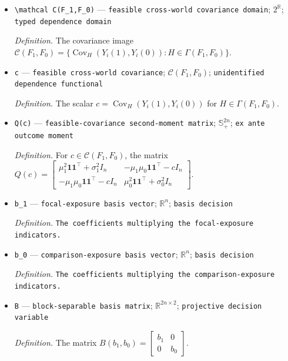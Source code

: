 \documentclass{article}
\begin{document}
\begin{itemize}
  \item \texttt{\textbackslash{}\allowbreak{}mathcal C(F\_\allowbreak{}1,\allowbreak{}F\_\allowbreak{}0)} --- \texttt{feasible cross-\allowbreak{}world covariance domain}; \(2^{\mathbb R}\); \texttt{typed dependence domain}
  \par\smallskip\noindent\emph{Definition.} The covariance image \(\mathcal C(F_1,F_0)=\{\operatorname{Cov}_H(Y_i(1),Y_i(0)):H\in\Gamma(F_1,F_0)\}\).
  \item \texttt{c} --- \texttt{feasible cross-\allowbreak{}world covariance}; \(\mathcal C(F_1,F_0)\); \texttt{unidentified dependence functional}
  \par\smallskip\noindent\emph{Definition.} The scalar \(c=\operatorname{Cov}_H(Y_i(1),Y_i(0))\) for \(H\in\Gamma(F_1,F_0)\).
  \item \texttt{Q(c)} --- \texttt{feasible-\allowbreak{}covariance second-\allowbreak{}moment matrix}; \(\mathbb S_+^{2n}\); \texttt{ex ante outcome moment}
  \par\smallskip\noindent\emph{Definition.} For \(c\in\mathcal C(F_1,F_0)\), the matrix \(Q(c)=\begin{bmatrix}\mu_1^2\mathbf 1\mathbf 1^{\top}+\sigma_1^2I_n&-\mu_1\mu_0\mathbf 1\mathbf 1^{\top}-cI_n\\-\mu_1\mu_0\mathbf 1\mathbf 1^{\top}-cI_n&\mu_0^2\mathbf 1\mathbf 1^{\top}+\sigma_0^2I_n\end{bmatrix}\).
  \item \texttt{b\_\allowbreak{}1} --- \texttt{focal-\allowbreak{}exposure basis vector}; \(\mathbb R^n\); \texttt{basis decision}
  \par\smallskip\noindent\emph{Definition.} \texttt{The coefficients multiplying the focal-\allowbreak{}exposure indicators.}
  \item \texttt{b\_\allowbreak{}0} --- \texttt{comparison-\allowbreak{}exposure basis vector}; \(\mathbb R^n\); \texttt{basis decision}
  \par\smallskip\noindent\emph{Definition.} \texttt{The coefficients multiplying the comparison-\allowbreak{}exposure indicators.}
  \item \texttt{B} --- \texttt{block-\allowbreak{}separable basis matrix}; \(\mathbb R^{2n\times2}\); \texttt{projective decision variable}
  \par\smallskip\noindent\emph{Definition.} The matrix \(B(b_1,b_0)=\begin{bmatrix}b_1&0\\0&b_0\end{bmatrix}\).

\end{itemize}
\end{document}
